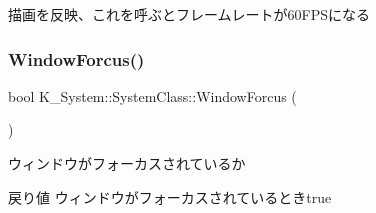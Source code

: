 描画を反映、これを呼ぶとフレームレートが60\+F\+P\+Sになる 

\mbox{\label{class_k___system_1_1_system_class_ab36bf9672ef9967b829b95da744c5394}} 
\subsubsection{\texorpdfstring{Window\+Forcus()}{WindowForcus()}}
{\footnotesize\ttfamily bool K\+\_\+\+System\+::\+System\+Class\+::\+Window\+Forcus (\begin{DoxyParamCaption}{ }\end{DoxyParamCaption})}



ウィンドウがフォーカスされているか 

\begin{DoxyReturn}{戻り値}
ウィンドウがフォーカスされているときtrue 
\end{DoxyReturn}
